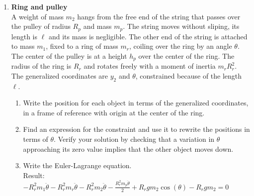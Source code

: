 \documentclass[11pt, a4paper, twoside]{article}
\begin{document}
\begin{enumerate}
	\item 
	\begin{minipage}[t][6cm]{0.57\textwidth}
		\textbf{Ring and pulley}\\
		A weight of mass \(m_2\) hangs from the free end of the string that passes over the pulley of radius \(R_{p}\) and mass \(m_{p}\).
		The string moves without sliping, its length is \(\ell\) and its mass is negligible.
		The other end of the string is attached to mass \(m_1\), fixed to a ring of mass \(m_{r}\), coiling over the ring by an angle \(\theta\).
		The center of the pulley is at a height \(h_{p}\) over the center of the ring. The radius of the ring is \(R_{r}\) and rotates freely with a moment of inertia \(m_{r} R_{r}^2\).
		The generalized coordinates are \(y_{2}\) and \(\theta\), constrained because of the length \(\ell\).
	\end{minipage}
	\begin{minipage}[c][1.5cm][t]{0.2\textwidth}
		
	\end{minipage}
	\begin{enumerate}
		\item Write the position for each object in terms of the generalized coordinates, in a frame of reference with origin at the center of the ring.
		\item Find an expression for the constraint and use it to rewrite the positions in terms of \(\theta\).
		Verify your solution by checking that a variation in \(\theta\) approaching its zero value implies that the other object moves down.
		\item Write the Euler-Lagrange equation.\\
		Result:
		\(
		- R_{r}^{2} m_1 \ddot{\theta} - R_{r}^{2} m_{r} \ddot{\theta} - R_{r}^{2} m_2 \ddot{\theta} - \frac{R_{r}^{2} m_{p} \ddot{\theta}}{2} + R_{r} g m_2 \cos{\left(\theta \right)} - R_{r} g m_2 = 0
		\)
	\end{enumerate}



\end{enumerate}
\end{document}
